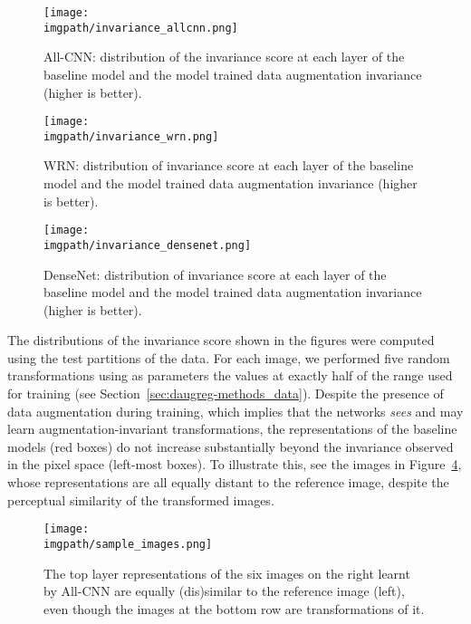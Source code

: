 {\begin{figure}[ht]
  \begin{center}
    \texttt{[image: \\imgpath/invariance\_allcnn.png]}
  \end{center}
  \caption{All-CNN: distribution of the invariance score at each layer of the baseline model and the model trained data augmentation invariance (higher is better).}
  \label{fi:invariance-invariance_allcnn}
\end{figure}

\begin{figure}[ht]
  \begin{center}
    \texttt{[image: \\imgpath/invariance\_wrn.png]}
  \end{center}
  \caption{WRN: distribution of invariance score at each layer of the baseline model and the model trained data augmentation invariance (higher is better).}
  \label{fi:invariance-invariance_wrn}
\end{figure}

\begin{figure}[ht]
  \begin{center}
    \texttt{[image: \\imgpath/invariance\_densenet.png]}
  \end{center}
  \caption{DenseNet: distribution of invariance score at each layer of the baseline model and the model trained data augmentation invariance (higher is better).}
  \label{fi:invariance-invariance_densenet}
\end{figure}

The distributions of the invariance score shown in the figures were computed using the test partitions of the data. For each image, we performed five random transformations using as parameters the values at exactly half of the range used for training (see Section~\ref{sec:daugreg-methods_data}). Despite the presence of data augmentation during training, which implies that the networks \textit{sees} and may learn augmentation-invariant transformations, the representations of the baseline models (red boxes) do not increase substantially beyond the invariance observed in the pixel space (left-most boxes). To illustrate this, see the images in Figure~\ref{fig:invariance-sample_images}, whose representations are all equally distant to the reference image, despite the perceptual similarity of the transformed images. 

\begin{figure}[htb]
  \begin{center}
    \texttt{[image: \\imgpath/sample\_images.png]}
  \end{center}
  \caption{The top layer representations of the six images on the right learnt by All-CNN are equally (dis)similar to the reference image (left), even though the images at the bottom row are transformations of it.}
  \label{fig:invariance-sample_images}
\end{figure}

}
